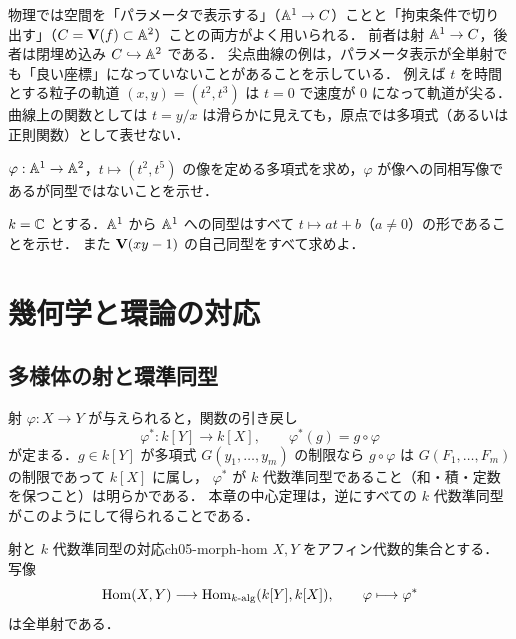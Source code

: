 \begin{physbox}[埋め込みとパラメータ表示]
物理では空間を「パラメータで表示する」（$\mathbb{A}^1\to C$）ことと「拘束条件で切り出す」（$C=\mathbf{V}(f)\subset\mathbb{A}^2$）ことの両方がよく用いられる．
前者は射 $\mathbb{A}^1\to C$，後者は閉埋め込み $C\hookrightarrow\mathbb{A}^2$ である．
尖点曲線の例は，パラメータ表示が全単射でも「良い座標」になっていないことがあることを示している．
例えば $t$ を時間とする粒子の軌道 $(x,y)=(t^2,t^3)$ は $t=0$ で速度が $0$ になって軌道が尖る．
曲線上の関数としては $t=y/x$ は滑らかに見えても，原点では多項式（あるいは正則関数）として表せない．
\end{physbox}

$\varphi:\mathbb{A}^1\to\mathbb{A}^2$，$t\mapsto(t^2,t^5)$ の像を定める多項式を求め，$\varphi$ が像への同相写像であるが同型ではないことを示せ．

$k=\mathbb{C}$ とする．$\mathbb{A}^1$ から $\mathbb{A}^1$ への同型はすべて $t\mapsto at+b$（$a\neq0$）の形であることを示せ．
また $\mathbf{V}(xy-1)$ の自己同型をすべて求めよ．

\section{幾何学と環論の対応}
\label{sec:ch05-ring-geom}

\subsection{多様体の射と環準同型}

射 $\varphi:X\to Y$ が与えられると，関数の引き戻し
\[
  \varphi^*:k[Y]\to k[X],\qquad \varphi^*(g)=g\circ\varphi
\]
が定まる．$g\in k[Y]$ が多項式 $G(y_1,\dots,y_m)$ の制限なら $g\circ\varphi$ は $G(F_1,\dots,F_m)$ の制限であって $k[X]$ に属し，
$\varphi^*$ が $k$ 代数準同型であること（和・積・定数を保つこと）は明らかである．
本章の中心定理は，逆にすべての $k$ 代数準同型がこのようにして得られることである．

\begin{mythm}{射と $k$ 代数準同型の対応}{ch05-morph-hom}
$X,Y$ をアフィン代数的集合とする．写像
\[
  \operatorname{Hom}(X,Y)\longrightarrow\operatorname{Hom}_{k\text{-alg}}(k[Y],k[X]),\qquad \varphi\longmapsto\varphi^*
\]
は全単射である．
\end{mythm}

